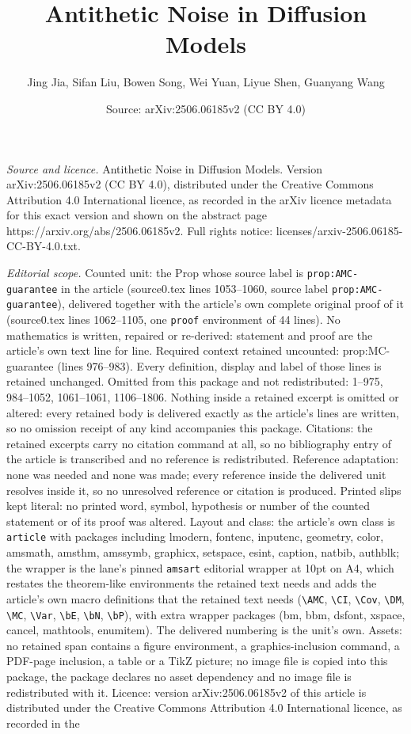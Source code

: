 \documentclass[10pt,a4paper]{amsart}
\title[Antithetic Noise in Diffusion Models]{Antithetic Noise in Diffusion Models}
\author{Jing Jia, Sifan Liu, Bowen Song, Wei Yuan, Liyue Shen, Guanyang Wang}
\date{Source: arXiv:2506.06185v2 (CC BY 4.0)}
\begin{document}
\maketitle

\noindent\emph{Source and licence.} Antithetic Noise in Diffusion Models. Version arXiv:2506.06185v2 (CC BY 4.0), distributed under the Creative Commons Attribution 4.0 International licence, as recorded in the arXiv licence metadata for this exact version and shown on the abstract page https://arxiv.org/abs/2506.06185v2. Full rights notice: licenses/arxiv-2506.06185-CC-BY-4.0.txt.\par\smallskip

\noindent\textit{Editorial scope.} Counted unit: the Prop whose source label is \texttt{prop:AMC-guarantee} in the article (source0.tex lines 1053--1060, source label \texttt{prop:AMC-guarantee}), delivered together with the article's own complete original proof of it (source0.tex lines 1062--1105, one \texttt{proof} environment of 44 lines). No mathematics is written, repaired or re-derived: statement and proof are the article's own text line for line. Required context retained uncounted: prop:MC-guarantee (lines 976--983). Every definition, display and label of those lines is retained unchanged. Omitted from this package and not redistributed: 1--975, 984--1052, 1061--1061, 1106--1806. Nothing inside a retained excerpt is omitted or altered: every retained body is delivered exactly as the article's lines are written, so no omission receipt of any kind accompanies this package. Citations: the retained excerpts carry no citation command at all, so no bibliography entry of the article is transcribed and no reference is redistributed. Reference adaptation: none was needed and none was made; every reference inside the delivered unit resolves inside it, so no unresolved reference or citation is produced. Printed slips kept literal: no printed word, symbol, hypothesis or number of the counted statement or of its proof was altered. Layout and class: the article's own class is \texttt{article} with packages including lmodern, fontenc, inputenc, geometry, color, amsmath, amsthm, amssymb, graphicx, setspace, esint, caption, natbib, authblk; the wrapper is the lane's pinned \texttt{amsart} editorial wrapper at 10pt on A4, which restates the theorem-like environments the retained text needs and adds the article's own macro definitions that the retained text needs (\texttt{\textbackslash AMC}, \texttt{\textbackslash CI}, \texttt{\textbackslash Cov}, \texttt{\textbackslash DM}, \texttt{\textbackslash MC}, \texttt{\textbackslash Var}, \texttt{\textbackslash bE}, \texttt{\textbackslash bN}, \texttt{\textbackslash bP}), with extra wrapper packages (bm, bbm, dsfont, xspace, cancel, mathtools, enumitem). The delivered numbering is the unit's own. Assets: no retained span contains a figure environment, a graphics-inclusion command, a PDF-page inclusion, a table or a TikZ picture; no image file is copied into this package, the package declares no asset dependency and no image file is redistributed with it. Licence: version arXiv:2506.06185v2 of this article is distributed under the Creative Commons Attribution 4.0 International licence, as recorded in the 
\end{document}
